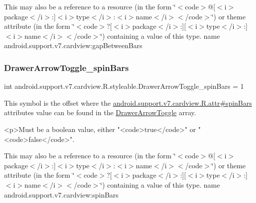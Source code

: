 This may also be a reference to a resource (in the form \char`\"{}$<$code$>$@\mbox{[}$<$i$>$package$<$/i$>$\+:\mbox{]}$<$i$>$type$<$/i$>$\+:$<$i$>$name$<$/i$>$$<$/code$>$\char`\"{}) or theme attribute (in the form \char`\"{}$<$code$>$?\mbox{[}$<$i$>$package$<$/i$>$\+:\mbox{]}\mbox{[}$<$i$>$type$<$/i$>$\+:\mbox{]}$<$i$>$name$<$/i$>$$<$/code$>$\char`\"{}) containing a value of this type.  name android.\+support.\+v7.\+cardview\+:gap\+Between\+Bars \mbox{\label{classandroid_1_1support_1_1v7_1_1cardview_1_1R_1_1styleable_adbe4eb7965e87739bfab8deb04a80751}} 
\subsubsection{\texorpdfstring{Drawer\+Arrow\+Toggle\+\_\+spin\+Bars}{DrawerArrowToggle\_spinBars}}
{\footnotesize\ttfamily int android.\+support.\+v7.\+cardview.\+R.\+styleable.\+Drawer\+Arrow\+Toggle\+\_\+spin\+Bars = 1\hspace{0.3cm}{\ttfamily [static]}}

This symbol is the offset where the \hyperlink{classandroid_1_1support_1_1v7_1_1cardview_1_1R_1_1attr_ae1b00aaf8423d096228a531fca8d1ab2}{android.\+support.\+v7.\+cardview.\+R.\+attr\#spin\+Bars} attribute\textquotesingle{}s value can be found in the \hyperlink{classandroid_1_1support_1_1v7_1_1cardview_1_1R_1_1styleable_a159ca17c520d2f2d93f6152d01b0b8df}{Drawer\+Arrow\+Toggle} array.

\begin{DoxyVerb}      <p>Must be a boolean value, either "<code>true</code>" or "<code>false</code>".
\end{DoxyVerb}
 

This may also be a reference to a resource (in the form \char`\"{}$<$code$>$@\mbox{[}$<$i$>$package$<$/i$>$\+:\mbox{]}$<$i$>$type$<$/i$>$\+:$<$i$>$name$<$/i$>$$<$/code$>$\char`\"{}) or theme attribute (in the form \char`\"{}$<$code$>$?\mbox{[}$<$i$>$package$<$/i$>$\+:\mbox{]}\mbox{[}$<$i$>$type$<$/i$>$\+:\mbox{]}$<$i$>$name$<$/i$>$$<$/code$>$\char`\"{}) containing a value of this type.  name android.\+support.\+v7.\+cardview\+:spin\+Bars \mbox{\label{classandroid_1_1support_1_1v7_1_1cardview_1_1R_1_1styleable_a9f8600b105c84f3a4e3054884f09d49e}} 
